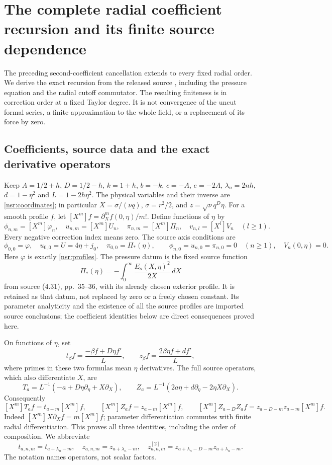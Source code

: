\section{The complete radial coefficient recursion and its finite source dependence}
\label{sec:ns-finite-radial-recursion}

The preceding second-coefficient cancellation extends to every fixed radial
order. We derive the exact recursion from the released source
\cite[(4.2), (5.2)--(5.6), Lemma 5.1]{openaiNS2026release}, including
the pressure equation and the radial cutoff commutator. The resulting
finiteness is in correction order at a fixed Taylor degree. It is not
convergence of the uncut formal series, a finite approximation to the
whole field, or a replacement of its force by zero.

\subsection{Coefficients, source data and the exact derivative operators}

Keep \(A=1/2+h\), \(D=1/2-h\), \(k=1+h\), \(b=-k\),
\(c=-A\), \(e=-2A\), \(\lambda_n=2nh\), \(d=1-\eta^2\)
and \(L=1-2h\eta^2\). The physical variables and their inverse are
\eqref{nsr:coordinates}; in particular \(X=\sigma/(\nu q)\),
\(\sigma=r^2/2\), and \(z=\sqrt\nu q^D\eta\).
For a smooth profile \(f\), let \([X^m]f=\partial_X^mf(0,\eta)/m!\).
Define functions of \(\eta\) by
\[
 \phi_{n,m}=[X^m]\varphi_n,\quad u_{n,m}=[X^m]U_n,\quad
 \pi_{n,m}=[X^m]\Pi_n,\quad v_{n,l}=[X^l]V_n\quad(l\geq1).
\]
Every negative correction index means zero. The source axis conditions are
\[
 \phi_{0,0}=\varphi,\quad u_{0,0}=U=4\eta+j_0,\quad
 \pi_{0,0}=\Pi_*(\eta),\qquad
 \phi_{n,0}=u_{n,0}=\pi_{n,0}=0\quad(n\geq1),\quad V_n(0,\eta)=0.
\]
Here \(\varphi\) is exactly \eqref{nsr:profiles}. The pressure datum is
the fixed source function
\[
 \Pi_*(\eta)=-\int_0^\infty\frac{E_o(X,\eta)^2}{2X}\,dX
\]
from source (4.31), pp.~35--36, with its already chosen exterior profile.
It is retained as that datum, not replaced by zero or a freely chosen
constant. Its parameter analyticity and the existence of all the source
profiles are imported source conclusions; the coefficient identities below
are direct consequences proved here.

On functions of \(\eta\), set
\[
 t_\beta f=\frac{-\beta f+D\eta f'}L,\qquad
 z_\beta f=\frac{2\beta\eta f+df'}L,
\]
where primes in these two formulas mean \(\eta\) derivatives. The full
source operators, which also differentiate \(X\), are
\[
 T_a=L^{-1}(-a+D\eta\partial_\eta+X\partial_X),\qquad
 Z_a=L^{-1}(2a\eta+d\partial_\eta-2\eta X\partial_X).
\]
Consequently
\begin{equation}\label{nfr:operators}
 [X^m]T_af=t_{a-m}[X^m]f,\qquad
 [X^m]Z_af=z_{a-m}[X^m]f,\qquad
 [X^m]Z_{a-D}Z_af=z_{a-D-m}z_{a-m}[X^m]f.
\end{equation}
Indeed \([X^m]X\partial_Xf=m[X^m]f\); parameter differentiation
commutes with finite radial differentiation. This proves all three
identities, including the order of composition. We abbreviate
\[
 t_{a,n,m}=t_{a+\lambda_n-m},\quad z_{a,n,m}=z_{a+\lambda_n-m},\quad
 z^{[2]}_{a,n,m}=z_{a+\lambda_n-D-m}z_{a+\lambda_n-m}.
\]
The notation names operators, not scalar factors.

